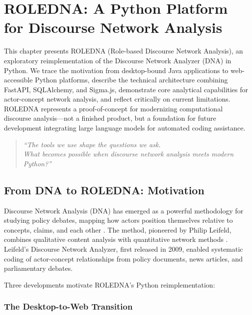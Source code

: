 \documentclass[../main.tex]{subfiles}
\begin{document}
\chapter{ROLEDNA: A Python Platform for Discourse Network Analysis}
\margintoc

\begin{chapteroverview}
This chapter presents ROLEDNA (Role-based Discourse Network Analysis), an exploratory reimplementation of the Discourse Network Analyzer (DNA) in Python. We trace the motivation from desktop-bound Java applications to web-accessible Python platforms, describe the technical architecture combining FastAPI, SQLAlchemy, and Sigma.js, demonstrate core analytical capabilities for actor-concept network analysis, and reflect critically on current limitations. ROLEDNA represents a proof-of-concept for modernizing computational discourse analysis---not a finished product, but a foundation for future development integrating large language models for automated coding assistance.
\end{chapteroverview}

\begin{quote}
\textit{``The tools we use shape the questions we ask.\\
What becomes possible when discourse network analysis meets modern Python?''}
\end{quote}


\section{From DNA to ROLEDNA: Motivation}

Discourse Network Analysis (DNA) has emerged as a powerful methodology for studying policy debates, mapping how actors position themselves relative to concepts, claims, and each other \cite{leifeld2013dna}. The method, pioneered by Philip Leifeld, combines qualitative content analysis with quantitative network methods . Leifeld's Discourse Network Analyzer, first released in 2009, enabled systematic coding of actor-concept relationships from policy documents, news articles, and parliamentary debates.

Three developments motivate ROLEDNA's Python reimplementation:

\subsection{The Desktop-to-Web Transition}
\end{document}
